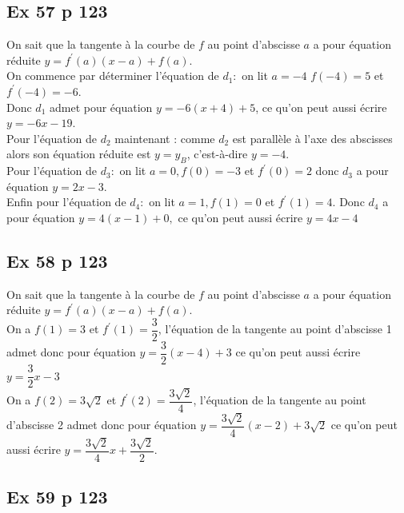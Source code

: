 \documentclass[12pt,a4paper]{book}
\begin{document}
\subsection*{Ex 57 p 123}

On sait que la tangente à la courbe de $f$ au point d'abscisse $a$ a pour équation réduite $y=f^{\prime}(a)(x-a)+f(a)$.\\

On commence par déterminer l'équation de $d_{1}:$ on lit $a=-4$ $f(-4)=5$ et $f^{\prime}(-4)=-6$.\\
Donc $d_{1}$ admet pour équation $y=-6(x+4)+5$, ce qu'on peut aussi écrire $y=-6 x-19$.\\

Pour l'équation de $d_{2}$ maintenant : comme $d_{2}$ est parallèle à l'axe des abscisses alors son équation réduite est $y=y_{B}$, c'est-à-dire $y=-4$.\\

Pour l'équation de $d_{3}:$ on lit $a=0, f(0)=-3$ et $ f^{\prime}(0)=2$ donc $d_{3}$ a pour équation $y=2 x-3$.\\

Enfin pour l'équation de $d_{4}:$ on lit $a=1, f(1)=0$ et $f^{\prime}(1)=4$. Donc $d_{4}$ a pour équation $y=4(x-1)+0,$ ce qu'on peut aussi écrire $y=4 x-4$

\subsection*{Ex 58 p 123}

On sait que la tangente à la courbe de $f$ au point d'abscisse $a$ a pour équation réduite $y=f^{\prime}(a)(x-a)+f(a)$.\\
On a $f(1)=3$ et $f^{\prime}(1)=\dfrac{3}{2}$, l'équation de la tangente au point d'abscisse 1 admet donc pour équation $y=\dfrac{3}{2}(x-4)+3$ ce qu'on peut aussi écrire $y=\dfrac{3}{2} x-3$\\

On a $f(2)=3 \sqrt{2}$ et $f^{\prime}(2)=\dfrac{3 \sqrt{2}}{4}$, l'équation de la tangente au point d'abscisse 2 admet donc pour
équation $y=\dfrac{3 \sqrt{2}}{4}(x-2)+3 \sqrt{2}$
ce qu'on peut aussi écrire $y=\dfrac{3 \sqrt{2}}{4} x+\dfrac{3 \sqrt{2}}{2}$.

\subsection*{Ex 59 p 123}
\end{document}
